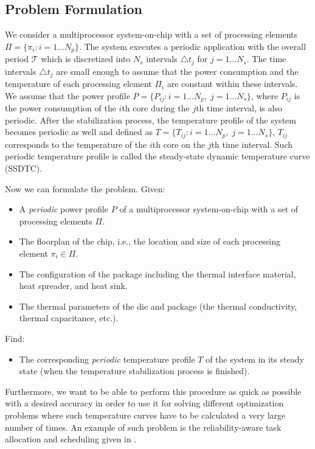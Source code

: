 \subsection{Problem Formulation}
We consider a multiprocessor system-on-chip with a set of processing elements $\Pi = \{ \pi_i: i = 1 \dots N_p \}$. The system executes a periodic application with the overall period $\mathcal{T}$ which is discretized into $N_s$ intervals $\triangle t_j$ for $j = 1 \dots N_s$. The time intervals $\triangle t_j$ are small enough to assume that the power consumption and the temperature of each processing element $\Pi_i$ are constant within these intervals. We assume that the power profile $P = \{ P_{ij}: i = 1 \dots N_p, \; j = 1 \dots N_s \}$, where $P_{ij}$ is the power consumption of the $i$th core during the $j$th time interval, is also periodic. After the stabilization process, the temperature profile of the system becomes periodic as well and defined as $T = \{ T_{ij}: i = 1 \dots N_p, \; j = 1 \dots N_s \}$, ${T_{ij}}$ corresponds to the temperature of the ${i}$th core on the $j$th time interval. Such periodic temperature profile is called the steady-state dynamic temperature curve (SSDTC).

Now we can formulate the problem. Given:
\begin{itemize}
  \item A \emph{periodic} power profile $P$ of a multiprocessor system-on-chip with a set of processing elements $\Pi$.
  \item The floorplan of the chip, i.e., the location and size of each processing element $\pi_i \in \Pi$.
  \item The configuration of the package including the thermal interface material, heat spreader, and heat sink.
  \item The thermal parameters of the die and package (the thermal conductivity, thermal capacitance, etc.).
\end{itemize}
Find:
\begin{itemize}
  \item The corresponding \emph{periodic} temperature profile $T$ of the system in its steady state (when the temperature stabilization process is finished).
\end{itemize}

Furthermore, we want to be able to perform this procedure as quick as possible with a desired accuracy in order to use it for solving different optimization problems where such temperature curves have to be calculated a very large number of times. An example of such problem is the reliability-aware task allocation and scheduling given in .

